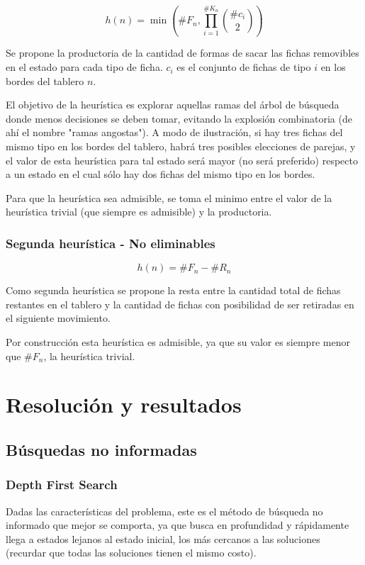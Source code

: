 \documentclass[a4paper,10pt]{article}
\begin{document}
    \[ h(n) = \min \left ( \# F_n, \prod_{i=1}^{\# K_n} {\# c_i \choose 2} \right )\]

    Se propone la productoria de la cantidad de formas de sacar las fichas removibles en el estado para cada tipo de ficha. $c_i$ es el conjunto de fichas de tipo $i$ en los bordes del tablero $n$.

    El objetivo de la heurística es explorar aquellas ramas del árbol de búsqueda donde menos decisiones se deben tomar, evitando la explosión combinatoria (de ahí el nombre "ramas angostas"). A modo de ilustración, si hay tres fichas del mismo tipo en los bordes del tablero, habrá tres posibles elecciones de parejas, y el valor de esta heurística para tal estado será mayor (no será preferido) respecto a un estado en el cual sólo hay dos fichas del mismo tipo en los bordes.

    Para que la heurística sea admisible, se toma el minimo entre el valor de la heurística trivial (que siempre es admisible) y la productoria.
    
    \subsubsection{Segunda heurística - No eliminables}

    \[ h(n) = \# F_n - \# R_n\] 

    Como segunda heurística se propone la resta entre la cantidad total de fichas restantes en el tablero y la cantidad de fichas con posibilidad de ser retiradas en el siguiente movimiento.

    Por construcción esta heurística es admisible, ya que su valor es siempre menor que $\#F_n$, la heurística trivial.

\section{Resolución y resultados}

\subsection{Búsquedas no informadas}

    \subsubsection{Depth First Search}
    \label{sec:dfs}
    Dadas las características del problema, este es el método de búsqueda no informado que mejor se comporta, ya que busca en profundidad y rápidamente llega a estados lejanos al estado inicial, los más cercanos a las soluciones (recurdar que todas las soluciones tienen el mismo costo).
\end{document}
